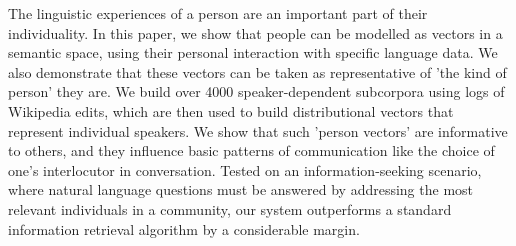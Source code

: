 The linguistic experiences of a person are an important part of their individuality. In this paper, we show that people can be modelled as vectors in a semantic space, using their personal interaction with specific language data. We also demonstrate that these vectors can be taken as representative of 'the kind of person' they are.  We build over 4000 speaker-dependent subcorpora using logs of Wikipedia edits, which are then used to build distributional vectors that represent individual speakers. We show that such 'person vectors' are informative to others, and they influence basic patterns of communication like the choice of one's interlocutor in conversation. Tested on an information-seeking scenario, where natural language questions must be answered by addressing the most relevant individuals in a community, our system outperforms a standard information retrieval algorithm by a considerable margin.
